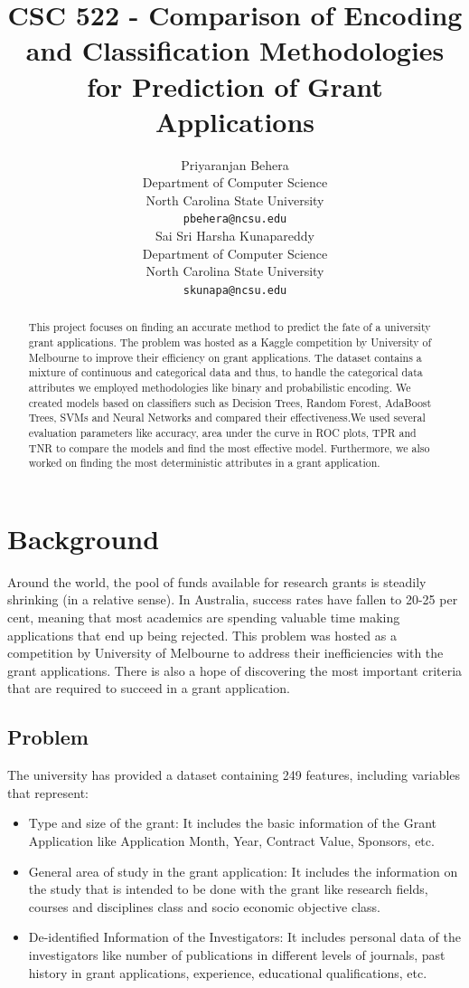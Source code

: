 \documentclass{article} %
\title{CSC 522 - Comparison of Encoding and Classification Methodologies for Prediction of Grant Applications}
\author{
	Priyaranjan Behera\\
	Department of Computer Science\\
	North Carolina State University\\
	\texttt{pbehera@ncsu.edu} \\
	\And
	Sai Sri Harsha Kunapareddy\\
	Department of Computer Science\\
	North Carolina State University\\
	\texttt{skunapa@ncsu.edu} \\
}
\begin{document}
	
	
	\maketitle
	
	\begin{abstract}
		This project focuses on finding an accurate method to predict the fate of a university grant applications. The problem was hosted as a Kaggle competition by University of Melbourne to improve their efficiency on grant applications. The dataset contains a mixture of continuous and categorical data and thus, to handle the categorical data attributes we employed methodologies like binary and probabilistic encoding.  We created models based on classifiers such as  Decision Trees, Random Forest, AdaBoost Trees, SVMs and Neural Networks and compared their effectiveness.We used several evaluation parameters like accuracy, area under the curve in ROC plots, TPR and TNR to compare the models and find the most effective model. Furthermore, we also worked on finding the most deterministic attributes in a grant application.
	\end{abstract}
	
	\section{Background}
	
	Around the world, the pool of funds available for research grants is steadily shrinking (in a relative sense). In Australia, success rates have fallen to 20-25 per cent, meaning that most academics are spending valuable time making applications that end up being rejected. This problem was hosted as a competition by University of Melbourne to address their inefficiencies with the grant applications. There is also a hope of discovering the most important criteria that are required to succeed in a grant application. 
	
	\subsection{Problem}
	
	The university has provided a dataset containing 249 features, including variables that represent:
	
	\begin{itemize}
		\item Type and size of the grant: It includes the basic information of the Grant Application like Application Month, Year, Contract Value, Sponsors, etc.
		\item General area of study in the grant application: It includes the information on the study that is intended to be done with the grant like  research fields, courses and disciplines class and socio economic objective class.
		\item De-identified Information of the Investigators: It includes personal data of the investigators like number of publications in different levels of journals, past history in grant applications, experience, educational qualifications, etc.  
	\end{itemize}
	
\end{document}
